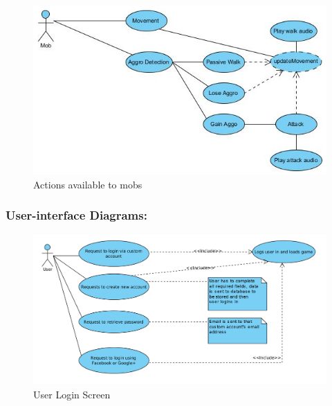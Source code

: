 \documentclass[letterpaper]{article}
\begin{document}
					\begin{figure}[H]
					\centering
					\includegraphics[width=140mm]{UML_Diagram/Use_Case/Mob_Actions.jpg}
					\caption{Actions available to mobs}
					\end{figure}
					
				\vspace{0.2in}
				\subsubsection*{User-interface Diagrams:}
				\vspace{0.2in}
				
					\begin{figure}[H]
					\centering
					\includegraphics[width=140mm]{UML_Diagram/Use_Case/User_Login.jpg}
					\caption{User Login Screen}
					\end{figure}
				
\end{document}
